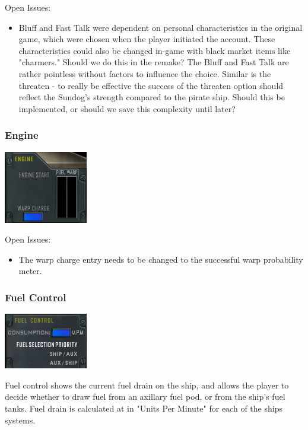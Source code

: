 \begin{itemize}
Open Issues:
\begin{itemize}
\item Bluff and Fast Talk were dependent on personal characteristics in the original game, which were chosen when the player initiated the account. These characteristics could also be changed in-game with black market items like "charmers." Should we do this in the remake? The Bluff and Fast Talk are rather pointless without factors to influence the choice. Similar is the threaten - to really be effective the success of the threaten option should reflect the Sundog's strength compared to the pirate ship. Should this be implemented, or should we save this complexity until later? 

\end{itemize}




\subsubsection{Engine}
\includegraphics[scale=0.70]{images/engine.png}

Open Issues:
\begin{itemize}
\item The warp charge entry needs to be changed to the successful warp
probability meter.
\end{itemize}

\subsubsection{Fuel Control}
\includegraphics[scale=0.70]{images/fuelcontrol.png}

Fuel control shows the current fuel drain on the ship, and allows the player
to decide whether to draw fuel from an axillary fuel pod, or from the
ship's fuel tanks.  Fuel drain is calculated at in "Units Per Minute" for
each of the ships systems.


\end{itemize}

